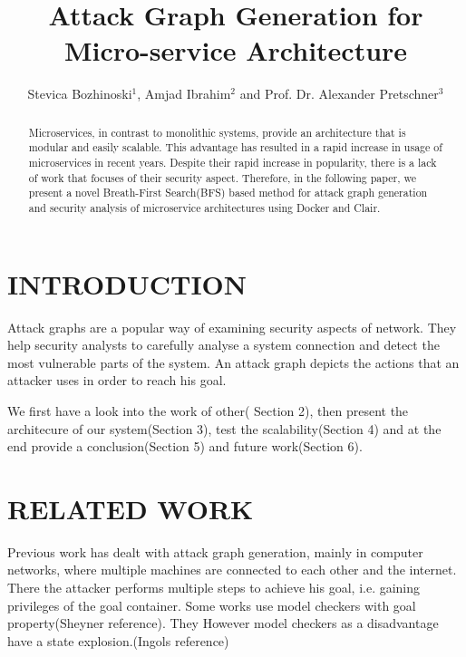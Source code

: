 \documentclass[letterpaper, 10 pt, conference]{ieeeconf}  %
\title{\LARGE \bf
Attack Graph Generation for Micro-service
Architecture
}
\author{Stevica Bozhinoski$^{1}$, Amjad Ibrahim$^{2}$ and Prof. Dr. Alexander Pretschner$^{3}$%
}
\begin{document}
\maketitle
\thispagestyle{empty}
\pagestyle{empty}


\begin{abstract}
Microservices, in contrast to monolithic systems, provide an architecture that is modular and easily scalable. This advantage has resulted in a rapid increase in usage of microservices in recent years. Despite their rapid increase in popularity, there is a lack of work that focuses of their security aspect. Therefore, in the following paper, we present a novel Breath-First Search(BFS) based method for attack graph generation and security analysis of microservice architectures using Docker and Clair. 

\end{abstract}


\section{INTRODUCTION}



Attack graphs are a popular way of examining security aspects of network. They help security analysts to carefully analyse a system connection and detect the most vulnerable parts of the system. An attack graph depicts the actions that an attacker uses in order to reach his goal.  

We first have a look into the work of other( Section 2), then present the architecure of our system(Section 3), test the scalability(Section 4) and at the end provide a conclusion(Section 5) and future work(Section 6).

\section{RELATED WORK}

Previous work has dealt with attack graph generation, mainly in computer networks, where multiple machines are connected to each other and the internet. There the attacker performs multiple steps to achieve his goal, i.e. gaining privileges of the goal container. Some works use model checkers with goal property(Sheyner reference). They However model checkers as a disadvantage have a state explosion.(Ingols reference)
\end{document}
